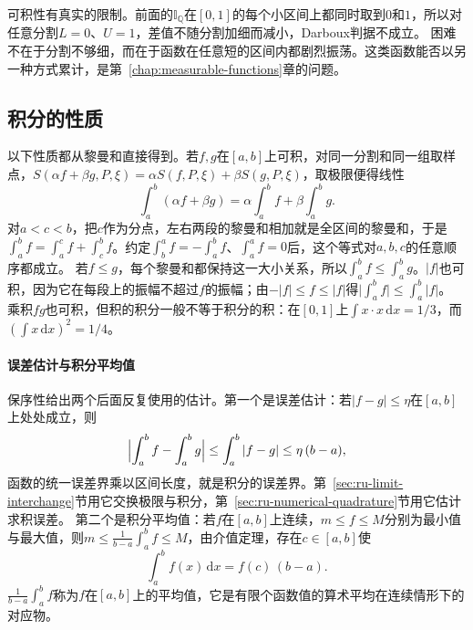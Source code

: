 可积性有真实的限制。前面的$\mathbb I_{\mathbb Q}$在$[0,1]$的每个小区间上都同时取到$0$和$1$，所以对任意分割$L=0$、$U=1$，差值不随分割加细而减小，Darboux判据不成立。
困难不在于分割不够细，而在于函数在任意短的区间内都剧烈振荡。这类函数能否以另一种方式累计，是第~\ref{chap:measurable-functions}章的问题。

\subsection{积分的性质}
\label{sec:ru-integral-properties}

以下性质都从黎曼和直接得到。若$f,g$在$[a,b]$上可积，对同一分割和同一组取样点，$S(\alpha f+\beta g,P,\xi)=\alpha S(f,P,\xi)+\beta S(g,P,\xi)$，取极限便得线性
\[
 \int_a^b(\alpha f+\beta g)=\alpha\int_a^bf+\beta\int_a^bg.
\]
对$a<c<b$，把$c$作为分点，左右两段的黎曼和相加就是全区间的黎曼和，于是$\int_a^bf=\int_a^cf+\int_c^bf$。约定$\int_b^af=-\int_a^bf$、$\int_a^af=0$后，这个等式对$a,b,c$的任意顺序都成立。
若$f\leq g$，每个黎曼和都保持这一大小关系，所以$\int_a^bf\leq\int_a^bg$。$|f|$也可积，因为它在每段上的振幅不超过$f$的振幅；由$-|f|\leq f\leq|f|$得$\bigl|\int_a^bf\bigr|\leq\int_a^b|f|$。
乘积$fg$也可积，但积的积分一般不等于积分的积：在$[0,1]$上$\int x\cdot x\,\mathrm dx=1/3$，而$(\int x\,\mathrm dx)^2=1/4$。

\paragraph{误差估计与积分平均值}
保序性给出两个后面反复使用的估计。第一个是误差估计：若$|f-g|\leq\eta$在$[a,b]$上处处成立，则
\[
 \Bigl|\int_a^bf-\int_a^bg\Bigr|\leq\int_a^b|f-g|\leq\eta\,(b-a),
\]
函数的统一误差界乘以区间长度，就是积分的误差界。第~\ref{sec:ru-limit-interchange}节用它交换极限与积分，第~\ref{sec:ru-numerical-quadrature}节用它估计求积误差。
第二个是积分平均值：若$f$在$[a,b]$上连续，$m\leq f\leq M$分别为最小值与最大值，则$m\leq\frac1{b-a}\int_a^bf\leq M$，由介值定理，存在$c\in[a,b]$使
\[
 \int_a^bf(x)\,\mathrm dx=f(c)\,(b-a).
\]
$\frac1{b-a}\int_a^bf$称为$f$在$[a,b]$上的平均值，它是有限个函数值的算术平均在连续情形下的对应物。
